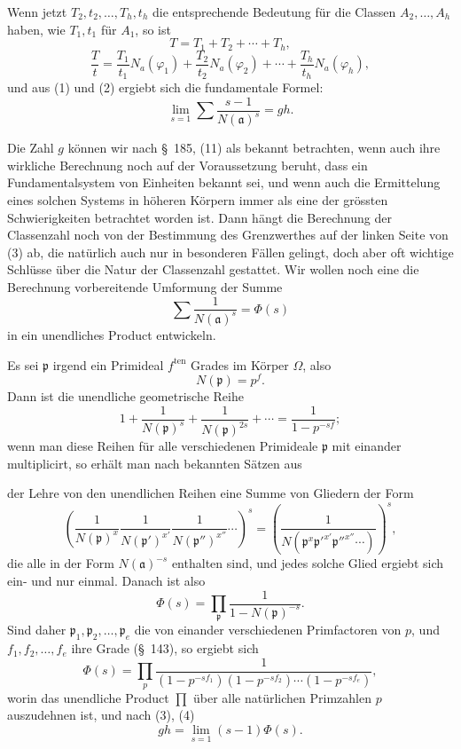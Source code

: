 \documentclass[11pt]{article}
\begin{document}
Wenn jetzt $T_2,t_2,\ldots,T_h,t_h$ die entsprechende Bedeutung für die Classen $A_2,\ldots,A_h$ haben, wie $T_1,t_1$ für $A_1$, so ist
\[
T=T_1+T_2+\cdots+T_h,
\]
\[
\frac{T}{t}=\frac{T_1}{t_1}N_a(\varphi_1)+\frac{T_2}{t_2}N_a(\varphi_2)+\cdots+
\frac{T_h}{t_h}N_a(\varphi_h),
\]
und aus (1) und (2) ergiebt sich die fundamentale Formel:
\begin{equation}
\lim_{s=1}\sum\frac{s-1}{N(\mathfrak a)^s}=gh.
\tag{3}
\end{equation}

Die Zahl $g$ können wir nach \S~185, (11) als bekannt betrachten, wenn auch ihre wirkliche Berechnung noch auf der Voraussetzung beruht, dass ein Fundamentalsystem von Einheiten bekannt sei, und wenn auch die Ermittelung eines solchen Systems in höheren Körpern immer als eine der grössten Schwierigkeiten betrachtet worden ist. Dann hängt die Berechnung der Classenzahl noch von der Bestimmung des Grenzwerthes auf der linken Seite von (3) ab, die natürlich auch nur in besonderen Fällen gelingt, doch aber oft wichtige Schlüsse über die Natur der Classenzahl gestattet. Wir wollen noch eine die Berechnung vorbereitende Umformung der Summe
\begin{equation}
\sum\frac1{N(\mathfrak a)^s}=\Phi(s)
\tag{4}
\end{equation}
in ein unendliches Product entwickeln.

Es sei $\mathfrak p$ irgend ein Primideal $f^{\mathrm{ten}}$ Grades im Körper $\Omega$, also
\[
N(\mathfrak p)=p^f.
\]
Dann ist die unendliche geometrische Reihe
\[
1+\frac1{N(\mathfrak p)^s}+\frac1{N(\mathfrak p)^{2s}}+\cdots
=\frac1{1-p^{-sf}};
\]
wenn man diese Reihen für alle verschiedenen Primideale $\mathfrak p$ mit einander multiplicirt, so erhält man nach bekannten Sätzen aus

der Lehre von den unendlichen Reihen eine Summe von Gliedern der Form
\[
\left(\frac1{N(\mathfrak p)^x}\frac1{N(\mathfrak p')^{x'}}\frac1{N(\mathfrak p'')^{x''}}\cdots\right)^s
=\left(\frac1{N(\mathfrak p^x\mathfrak p'^{x'}\mathfrak p''^{x''}\cdots)}\right)^s,
\]
die alle in der Form $N(\mathfrak a)^{-s}$ enthalten sind, und jedes solche Glied ergiebt sich ein- und nur einmal. Danach ist also
\begin{equation}
\Phi(s)=\prod_{\mathfrak p}\frac1{1-N(\mathfrak p)^{-s}}.
\tag{5}
\end{equation}
Sind daher $\mathfrak p_1,\mathfrak p_2,\ldots,\mathfrak p_e$ die von einander verschiedenen Primfactoren von $p$, und $f_1,f_2,\ldots,f_e$ ihre Grade (\S~143), so ergiebt sich
\begin{equation}
\Phi(s)=\prod_p
\frac1{(1-p^{-sf_1})(1-p^{-sf_2})\cdots(1-p^{-sf_e})},
\tag{6}
\end{equation}
worin das unendliche Product $\prod$ über alle natürlichen Primzahlen $p$ auszudehnen ist, und nach (3), (4)
\begin{equation}
gh=\lim_{s=1}(s-1)\Phi(s).
\tag{7}
\end{equation}
\end{document}
